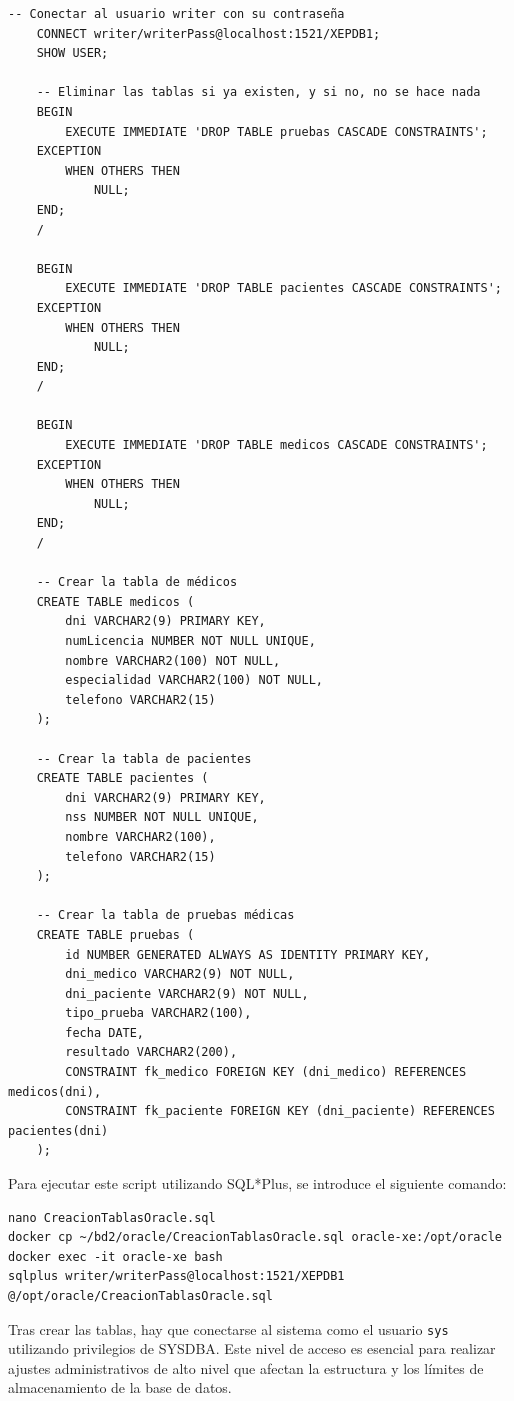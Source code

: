 \documentclass{article}
\begin{document}
\begin{lstlisting}[style=bashStyle]
    -- Conectar al usuario writer con su contraseña
    CONNECT writer/writerPass@localhost:1521/XEPDB1;
    SHOW USER;
    
    -- Eliminar las tablas si ya existen, y si no, no se hace nada
    BEGIN
        EXECUTE IMMEDIATE 'DROP TABLE pruebas CASCADE CONSTRAINTS';
    EXCEPTION
        WHEN OTHERS THEN
            NULL;  
    END;
    /
    
    BEGIN
        EXECUTE IMMEDIATE 'DROP TABLE pacientes CASCADE CONSTRAINTS';
    EXCEPTION
        WHEN OTHERS THEN
            NULL; 
    END;
    /
    
    BEGIN
        EXECUTE IMMEDIATE 'DROP TABLE medicos CASCADE CONSTRAINTS';
    EXCEPTION
        WHEN OTHERS THEN
            NULL;  
    END;
    /
    
    -- Crear la tabla de médicos
    CREATE TABLE medicos (
        dni VARCHAR2(9) PRIMARY KEY,
        numLicencia NUMBER NOT NULL UNIQUE,
        nombre VARCHAR2(100) NOT NULL,
        especialidad VARCHAR2(100) NOT NULL,
        telefono VARCHAR2(15)
    );
    
    -- Crear la tabla de pacientes
    CREATE TABLE pacientes (
        dni VARCHAR2(9) PRIMARY KEY,
        nss NUMBER NOT NULL UNIQUE,
        nombre VARCHAR2(100),
        telefono VARCHAR2(15)
    );
    
    -- Crear la tabla de pruebas médicas
    CREATE TABLE pruebas (
        id NUMBER GENERATED ALWAYS AS IDENTITY PRIMARY KEY,
        dni_medico VARCHAR2(9) NOT NULL,
        dni_paciente VARCHAR2(9) NOT NULL,
        tipo_prueba VARCHAR2(100),
        fecha DATE,
        resultado VARCHAR2(200),
        CONSTRAINT fk_medico FOREIGN KEY (dni_medico) REFERENCES medicos(dni),
        CONSTRAINT fk_paciente FOREIGN KEY (dni_paciente) REFERENCES pacientes(dni)
    );
\end{lstlisting}

Para ejecutar este script utilizando SQL*Plus, se introduce el siguiente comando:

\begin{lstlisting}[style=bashStyle]
nano CreacionTablasOracle.sql
docker cp ~/bd2/oracle/CreacionTablasOracle.sql oracle-xe:/opt/oracle
docker exec -it oracle-xe bash
sqlplus writer/writerPass@localhost:1521/XEPDB1
@/opt/oracle/CreacionTablasOracle.sql
\end{lstlisting}

Tras crear las tablas, hay que conectarse al sistema como el usuario \texttt{sys} utilizando privilegios de SYSDBA. Este nivel de acceso es esencial para realizar ajustes administrativos de alto nivel que afectan la estructura y los límites de almacenamiento de la base de datos.
\end{document}
